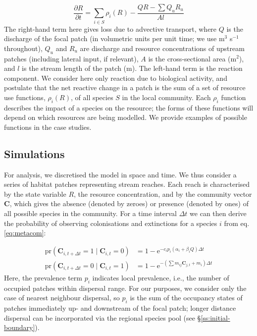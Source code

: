 \begin{equation}
	\frac{\partial R}{\partial t} = \sum_{i \in S}{\rho_i(R)} -\frac{QR - \sum Q_u R_u}{A l} 
	\label{eq:rxn_transport}
\end{equation}
The right-hand term here gives loss due to advective transport, where $Q$ is the discharge of the focal patch (in volumetric units per unit time; we use m$^3$ s$^{-1}$ throughout), $Q_u$ and $R_u$ are discharge and resource concentrations of upstream patches (including lateral input, if relevant), $A$ is the cross-sectional area (m$^2$), and $l$ is the stream length of the patch (m).
The left-hand term is the reaction component.
We consider here only reaction due to biological activity, and postulate that the net reactive change in a patch is the sum of a set of resource use functions, $\rho_i(R)$, of all species $S$ in the local community. 
Each $\rho_i$ function describes the impact of a species on the resource; the forms of these functions will depend on which resources are being modelled.
We provide examples of possible functions in the case studies.


\subsection{Simulations}

For analysis, we discretised the model in space and time.
We thus consider a series of habitat patches representing stream reaches.
Each reach is characterised by the state variable $R$, the resource concentration, and by the community vector $\mathbf{C}$, which gives the absence (denoted by zeroes) or presence (denoted by ones) of all possible species in the community.
For a time interval $\Delta t$ we can then derive the probability of observing colonisations and extinctions for a species $i$ from eq. \ref{eq:metacom}:

\begin{equation}
\begin{split}
	\mathrm{pr}\left( \mathbf{C}_{i, t+\Delta t} = 1 \mid \mathbf{C}_{i, t} = 0\right) &= 
			1 - \mathrm{e}^{-c_i p_i(\alpha_i + \beta_iQ) \Delta t} \\
	\mathrm{pr}\left( \mathbf{C}_{i, t+\Delta t} = 0 \mid \mathbf{C}_{i, t} = 1\right) &= 
			1 - \mathrm{e}^{-\left( \sum{m_{ij}\mathbf{C}_{j, t}} + m_i \right)\Delta t}
	\label{eq:ceprob}
\end{split}
\end{equation}
Here, the prevalence term $p_i$ indicates local prevalence, i.e., the number of occupied patches within dispersal range.
For our purposes, we consider only the case of nearest neighbour dispersal, so $p_i$ is the sum of the occupancy states of patches immediately up- and downstream of the focal patch; longer distance dispersal can be incorporated via the regional species pool (see §\ref{ss:initial-boundary}).

